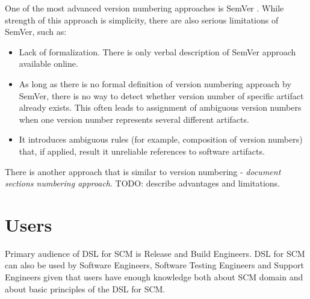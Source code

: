 \documentclass[11pt]{article}
\begin{document}
One of the most advanced version numbering approaches is SemVer \cite{semver}. While strength of this approach is simplicity, there are also serious limitations of SemVer, such as:
\begin{itemize}
\item Lack of formalization. There is only verbal description of SemVer approach available online. 
\item As long as there is no formal definition of version numbering approach by SemVer, there is no way to detect whether version number of specific artifact already exists. This often leads to assignment of ambiguous version numbers when one version number represents several different artifacts.
\item It introduces ambiguous rules (for example, composition of version numbers) that, if applied, result it unreliable references to software artifacts.
\end{itemize}

There is another approach that is similar to version numbering - \textit{document sections numbering approach}. TODO: describe advantages and limitations.

\section{Users}
\label{sec:users}

Primary audience of DSL for SCM is Release and Build Engineers. DSL for SCM can also be used by Software Engineers, Software Testing Engineers and Support Engineers given that users have enough knowledge both about SCM domain and about basic principles of the DSL for SCM. 
\end{document}
